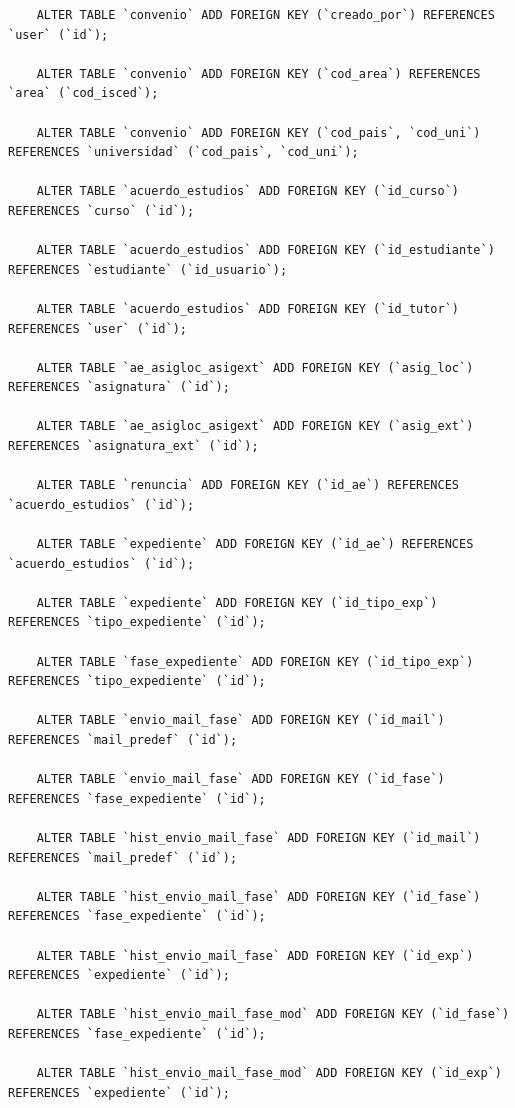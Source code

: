 \begin{verbatim}
	ALTER TABLE `convenio` ADD FOREIGN KEY (`creado_por`) REFERENCES `user` (`id`);
	
	ALTER TABLE `convenio` ADD FOREIGN KEY (`cod_area`) REFERENCES `area` (`cod_isced`);
	
	ALTER TABLE `convenio` ADD FOREIGN KEY (`cod_pais`, `cod_uni`) REFERENCES `universidad` (`cod_pais`, `cod_uni`);
	
	ALTER TABLE `acuerdo_estudios` ADD FOREIGN KEY (`id_curso`) REFERENCES `curso` (`id`);
	
	ALTER TABLE `acuerdo_estudios` ADD FOREIGN KEY (`id_estudiante`) REFERENCES `estudiante` (`id_usuario`);
	
	ALTER TABLE `acuerdo_estudios` ADD FOREIGN KEY (`id_tutor`) REFERENCES `user` (`id`);
	
	ALTER TABLE `ae_asigloc_asigext` ADD FOREIGN KEY (`asig_loc`) REFERENCES `asignatura` (`id`);
	
	ALTER TABLE `ae_asigloc_asigext` ADD FOREIGN KEY (`asig_ext`) REFERENCES `asignatura_ext` (`id`);
	
	ALTER TABLE `renuncia` ADD FOREIGN KEY (`id_ae`) REFERENCES `acuerdo_estudios` (`id`);
	
	ALTER TABLE `expediente` ADD FOREIGN KEY (`id_ae`) REFERENCES `acuerdo_estudios` (`id`);
	
	ALTER TABLE `expediente` ADD FOREIGN KEY (`id_tipo_exp`) REFERENCES `tipo_expediente` (`id`);
	
	ALTER TABLE `fase_expediente` ADD FOREIGN KEY (`id_tipo_exp`) REFERENCES `tipo_expediente` (`id`);
	
	ALTER TABLE `envio_mail_fase` ADD FOREIGN KEY (`id_mail`) REFERENCES `mail_predef` (`id`);
	
	ALTER TABLE `envio_mail_fase` ADD FOREIGN KEY (`id_fase`) REFERENCES `fase_expediente` (`id`);
	
	ALTER TABLE `hist_envio_mail_fase` ADD FOREIGN KEY (`id_mail`) REFERENCES `mail_predef` (`id`);
	
	ALTER TABLE `hist_envio_mail_fase` ADD FOREIGN KEY (`id_fase`) REFERENCES `fase_expediente` (`id`);
	
	ALTER TABLE `hist_envio_mail_fase` ADD FOREIGN KEY (`id_exp`) REFERENCES `expediente` (`id`);
	
	ALTER TABLE `hist_envio_mail_fase_mod` ADD FOREIGN KEY (`id_fase`) REFERENCES `fase_expediente` (`id`);
	
	ALTER TABLE `hist_envio_mail_fase_mod` ADD FOREIGN KEY (`id_exp`) REFERENCES `expediente` (`id`);
	

\end{verbatim}
